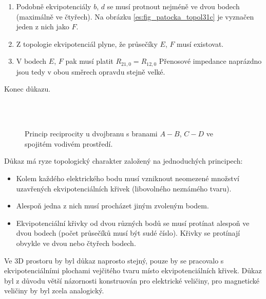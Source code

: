 \begin{enumerate}[noitemsep]
          \item Podobně ekvipotenciály \(b\), \(d\) se musí protnout nejméně ve dvou bodech 
                (maximálně ve čtyřech). Na obrázku \ref{es:fig_patocka_topol31c} je vyznačen jeden 
                z nich jako \(F\).
          
          \item Z topologie ekvipotenciál plyne, že průsečíky \(E\), \(F\) musí existovat.
          
          \item V bodech \(E\), \(F\) pak musí platit \(R_{21,0} = R_{12,0}\) Přenosové impedance 
                naprázdno jsou tedy v obou směrech opravdu stejně velké.
        \end{enumerate}
        Konec důkazu.
        \begin{figure}[ht!]
          \centering  
           \\
           \\
          \caption{Princip reciprocity u dvojbranu s branami \(A-B\), \(C-D\) ve spojitém vodivém 
                   prostředí. \cite[s.~65]{Patocka4}} 
          \label{es:fig_patocka_topol31}
        \end{figure} 
        
        Důkaz má ryze topologický charakter založený na jednoduchých principech:
        \begin{itemize}[noitemsep]
          \item Kolem každého elektrického bodu musí vzniknout neomezené množství uzavřených 
              ekvipotenciálních křivek (libovolného neznámého tvaru).
        
          \item Alespoň jedna z nich musí procházet jiným zvoleným bodem.
        
          \item Ekvipotenciální křivky od dvou různých bodů se musí protínat alespoň ve dvou bodech 
                (počet průsečíků musí být sudé číslo). Křivky se protínají obvykle ve dvou nebo 
                čtyřech bodech.
      \end{itemize}
      
        Ve 3D prostoru by byl důkaz naprosto stejný, pouze by se pracovalo s ekvipotenciálními
        plochami vejčitého tvaru místo ekvipotenciálních křivek. Důkaz byl z důvodu větší názornosti
        konstruován pro elektrické veličiny, pro magnetické veličiny by byl zcela analogický.
